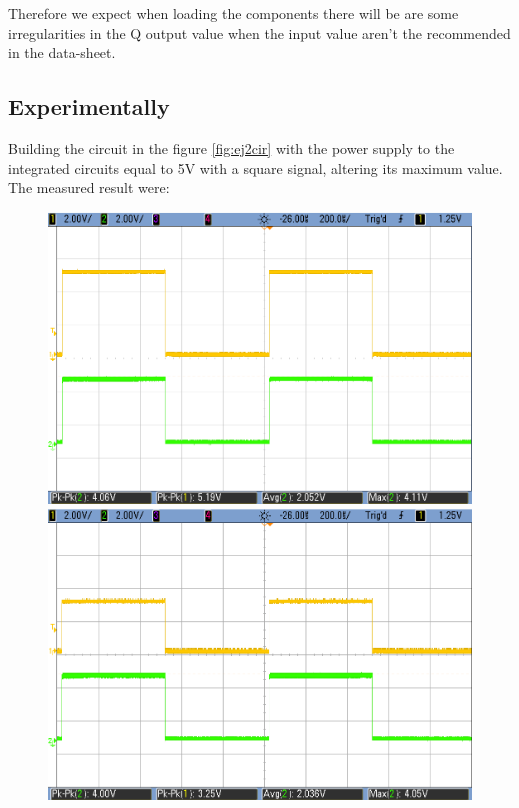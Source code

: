 	\pagebreak
	
	Therefore we expect when loading the components there will be are some irregularities in the Q output value when the input value aren't the recommended in the data-sheet. 

	\subsection{\color{purple}Experimentally}
	
	Building the circuit in the figure \ref{fig:ej2cir} with the power supply to the integrated circuits equal to 5V with a square signal, altering its maximum value. The measured result were:
	
	\begin{figure}[h!]
        \centering
        \includegraphics[scale=0.19]{../Exercise2/HC-LS-5V.png}\hspace{1cm}
        \includegraphics[scale=0.19]{../Exercise2/HC-LS-3V.png}\\

\end{figure}
